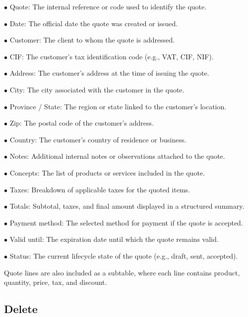 \documentclass[a4paper]{article}
\begin{document}
\begin{compactitem}
\item[\color{myblue}$\bullet$] Quote: The internal reference or code used to identify the quote.
\item[\color{myblue}$\bullet$] Date: The official date the quote was created or issued.
\item[\color{myblue}$\bullet$] Customer: The client to whom the quote is addressed.
\item[\color{myblue}$\bullet$] CIF: The customer's tax identification code (e.g., VAT, CIF, NIF).
\item[\color{myblue}$\bullet$] Address: The customer's address at the time of issuing the quote.
\item[\color{myblue}$\bullet$] City: The city associated with the customer in the quote.
\item[\color{myblue}$\bullet$] Province / State: The region or state linked to the customer's location.
\item[\color{myblue}$\bullet$] Zip: The postal code of the customer's address.
\item[\color{myblue}$\bullet$] Country: The customer's country of residence or business.
\item[\color{myblue}$\bullet$] Notes: Additional internal notes or observations attached to the quote.
\item[\color{myblue}$\bullet$] Concepts: The list of products or services included in the quote.
\item[\color{myblue}$\bullet$] Taxes: Breakdown of applicable taxes for the quoted items.
\item[\color{myblue}$\bullet$] Totals: Subtotal, taxes, and final amount displayed in a structured summary.
\item[\color{myblue}$\bullet$] Payment method: The selected method for payment if the quote is accepted.
\item[\color{myblue}$\bullet$] Valid until: The expiration date until which the quote remains valid.
\item[\color{myblue}$\bullet$] Status: The current lifecycle state of the quote (e.g., draft, sent, accepted).
\end{compactitem}

Quote lines are also included as a subtable, where each line contains product, quantity, price, tax, and discount.

\hypertarget{toc75}{}
\subsection{Delete}
\end{document}
